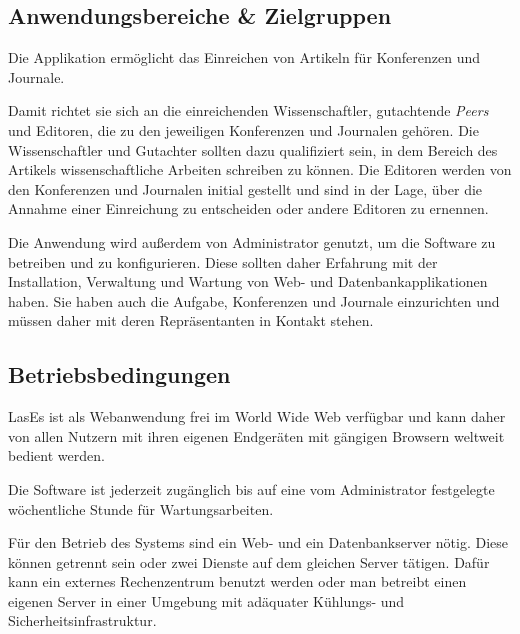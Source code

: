 
\subsection{Anwendungsbereiche \& Zielgruppen}

Die Applikation ermöglicht das Einreichen von Artikeln für Konferenzen und Journale.

Damit richtet sie sich an die einreichenden Wissenschaftler, gutachtende \emph{Peers} und Editoren, die zu den jeweiligen Konferenzen und Journalen gehören.
Die Wissenschaftler und Gutachter sollten dazu qualifiziert sein, in dem Bereich des Artikels wissenschaftliche Arbeiten schreiben zu können.
Die Editoren werden von den Konferenzen und Journalen initial gestellt und sind in der Lage, über die Annahme einer Einreichung zu entscheiden oder andere Editoren zu ernennen.

Die Anwendung wird außerdem von Administrator genutzt, um die Software zu betreiben und zu konfigurieren.
Diese sollten daher Erfahrung mit der Installation, Verwaltung und Wartung von Web- und Datenbankapplikationen haben.
Sie haben auch die Aufgabe, Konferenzen und Journale einzurichten und müssen daher mit deren Repräsentanten in Kontakt stehen.

\subsection{Betriebsbedingungen}

LasEs ist als Webanwendung frei im World Wide Web verfügbar und kann daher von allen Nutzern mit ihren eigenen Endgeräten mit gängigen Browsern weltweit bedient werden.

Die Software ist jederzeit zugänglich bis auf eine vom Administrator festgelegte wöchentliche Stunde für Wartungsarbeiten.

Für den Betrieb des Systems sind ein Web- und ein Datenbankserver nötig.
Diese können getrennt sein oder zwei Dienste auf dem gleichen Server tätigen.
Dafür kann ein externes Rechenzentrum benutzt werden oder man betreibt einen eigenen Server in einer Umgebung mit adäquater Kühlungs- und Sicherheitsinfrastruktur.